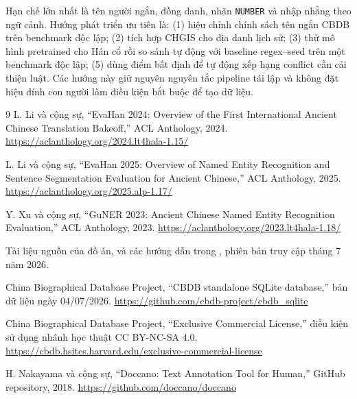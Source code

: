 \documentclass[11pt,a4paper]{article}
\begin{document}
Hạn chế lớn nhất là tên người ngắn, đồng danh, nhãn \texttt{NUMBER} và
nhập nhằng theo ngữ cảnh. Hướng phát triển ưu tiên là:
(1) hiệu chỉnh chính sách tên ngắn CBDB trên benchmark độc lập; (2) tích hợp
CHGIS cho địa danh lịch sử; (3) thử mô hình
pretrained cho Hán cổ rồi so sánh tự động với baseline regex--seed trên một
benchmark độc lập; (5) dùng điểm bất định để tự động xếp hạng conflict cần cải
thiện luật. Các hướng này giữ nguyên nguyên tắc pipeline tái lập và không đặt
hiệu đính con người làm điều kiện bắt buộc để tạo dữ liệu.

\begin{thebibliography}{9}
\small
{}
L. Li và cộng sự, ``EvaHan 2024: Overview of the First International Ancient
Chinese Translation Bakeoff,'' ACL Anthology, 2024.
\url{https://aclanthology.org/2024.lt4hala-1.15/}

L. Li và cộng sự, ``EvaHan 2025: Overview of Named Entity Recognition and
Sentence Segmentation Evaluation for Ancient Chinese,'' ACL Anthology, 2025.
\url{https://aclanthology.org/2025.alp-1.17/}

Y. Xu và cộng sự, ``GuNER 2023: Ancient Chinese Named Entity Recognition
Evaluation,'' ACL Anthology, 2023.
\url{https://aclanthology.org/2023.lt4hala-1.18/}

Tài liệu nguồn của đồ án,  và các hướng dẫn trong
, phiên bản truy cập tháng 7 năm 2026.

China Biographical Database Project, ``CBDB standalone SQLite database,''
bản dữ liệu ngày 04/07/2026.
\url{https://github.com/cbdb-project/cbdb_sqlite}

China Biographical Database Project, ``Exclusive Commercial License,'' điều
kiện sử dụng nhánh học thuật CC BY-NC-SA 4.0.
\url{https://cbdb.hsites.harvard.edu/exclusive-commercial-license}

H. Nakayama và cộng sự, ``Doccano: Text Annotation Tool for Human,''
GitHub repository, 2018.
\url{https://github.com/doccano/doccano}
\end{thebibliography}
\end{document}

